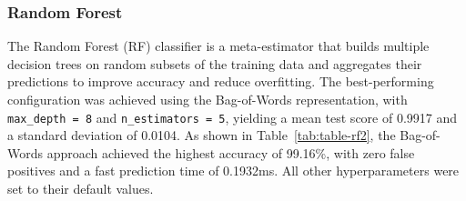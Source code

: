 \documentclass[conference]{IEEEtran}
\begin{document}
\begin{table}[H]
\caption{\label{tab:table-dt} Metrics for the Decision Tree Classifier.}
\end{table}
\vspace{-1.5ex}
\begin{table}[H]
\caption{\label{tab:table-dt2} Performance Metrics for the Decision Tree Classifier.}
\end{table}
 
\subsubsection{Random Forest}
The Random Forest (RF) classifier is a meta-estimator that builds multiple decision trees on random subsets of the training data and aggregates their predictions to improve accuracy and reduce overfitting. The best-performing configuration was achieved using the Bag-of-Words representation, with \texttt{max\_depth = 8} and \texttt{n\_estimators = 5}, yielding a mean test score of 0.9917 and a standard deviation of 0.0104. As shown in Table~\ref{tab:table-rf2}, the Bag-of-Words approach achieved the highest accuracy of 99.16\%, with zero false positives and a fast prediction time of 0.1932ms. All other hyperparameters were set to their default values.
\end{document}
